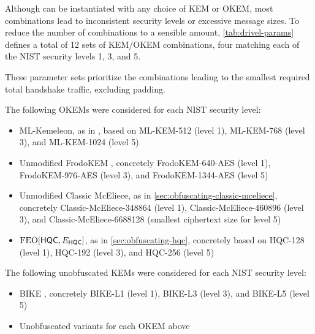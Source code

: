 Although \drivel{} can be instantiated with any choice of KEM or OKEM, most combinations lead to inconsistent security levels or excessive message sizes. To reduce the number of combinations to a sensible amount, \cref{tab:drivel-params} defines a total of 12 sets of KEM/OKEM combinations, four matching each of the NIST security levels 1, 3, and 5.

These parameter sets prioritize the combinations leading to the smallest required total handshake traffic, excluding padding.

The following OKEMs were considered for each NIST security level:
\begin{itemize}
    \item ML-Kemeleon, as in \cite{irtf-cfrg-kemeleon-00}, based on ML-KEM-512 (level 1), ML-KEM-768 (level 3), and ML-KEM-1024 (level 5)
    \item Unmodified FrodoKEM \cite{NISTPQC-R3:FrodoKEM20}, concretely FrodoKEM-640-AES (level 1), FrodoKEM-976-AES (level 3), and FrodoKEM-1344-AES (level 5)
    \item Unmodified Classic McEliece, as in \cref{sec:obfuscating-classic-mceliece}, concretely Classic-McEliece-348864 (level 1), Classic-McEliece-460896 (level 3), and Classic-McEliece-6688128 (smallest ciphertext size for level 5)
    \item $\textsf{\textnormal{FEO}}[\mathsf{HQC}, E_\mathsf{HQC}]$, as in \cref{sec:obfuscating-hqc}, concretely based on HQC-128 (level 1), HQC-192 (level 3), and HQC-256 (level 5)
\end{itemize}

The following unobfuscated KEMs were considered for each NIST security level:
\begin{itemize}
    \item BIKE \cite{NISTPQC-R4:BIKE22}, concretely BIKE-L1 (level 1), BIKE-L3 (level 3), and BIKE-L5 (level 5)
    \item Unobfuscated variants for each OKEM above 
\end{itemize}

